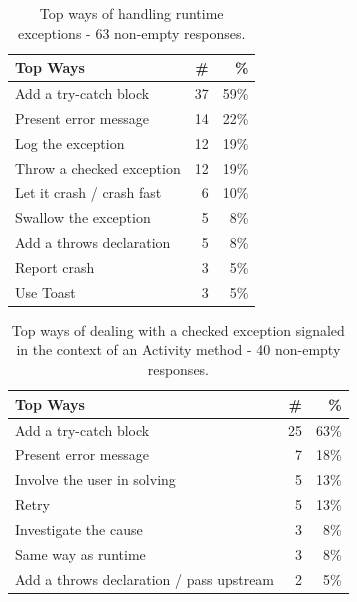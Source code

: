 \begin{table}
\scriptsize
\centering
\begin{tabular}{lrr}
\hline
\bfseries{Top Ways} & \bfseries{\#} & \bfseries{\%} \\
\hline
Add a try-catch block &	37 &	59\% \\
Present error message	&  14 &	22\% \\
Log the exception	& 12 &	19\% \\
Throw a checked exception	& 12 & 19\% \\
Let it crash / crash fast 	& 6 &	10\% \\
Swallow the exception	& 5 &	8\% \\
Add a throws declaration	& 5 &	8\% \\
Report crash &	3 &	5\% \\
Use Toast & 	3 &	5\% \\
\hline
\end{tabular}
\caption{Top ways of handling runtime exceptions -  63 non-empty responses. }
\label{tab:handlingruntime}
\end{table}		



\begin{table}
\scriptsize
\centering
\begin{tabular}{lrr}
\hline
\bfseries{Top Ways} & \bfseries{\#} & \bfseries{\%} \\
\hline
Add a try-catch block	& 25 &	63\% \\
Present error message	& 7 &	18\% \\
Involve the user in solving	& 5 &	13\% \\
Retry  &	5 &	13\% \\
Investigate the cause &	3 &	8\% \\
Same way as runtime	& 3 &	8\% \\
Add a throws declaration / pass upstream &	2 &	5\% \\
\hline
\end{tabular}
\caption{Top ways of dealing with a checked exception signaled in the context of an Activity method -  40 non-empty responses. }
\label{tab:handlingruntime}
\end{table}		


